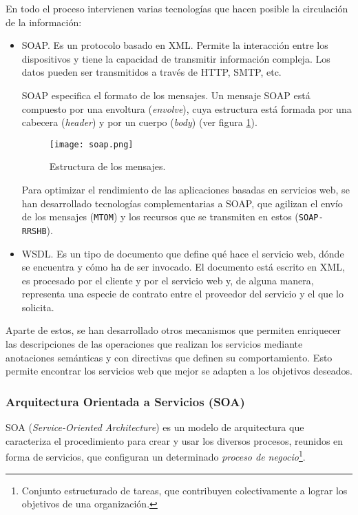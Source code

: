 En todo el proceso intervienen varias tecnologías que hacen posible la
circulación de la información:
\begin{itemize}
\item \acs{SOAP}. Es un protocolo basado en \acs{XML}. Permite la
interacción entre los dispositivos y tiene la capacidad de transmitir
información compleja. Los datos pueden ser transmitidos a través de 
\acs{HTTP}, \acs{SMTP}, etc.

\acs{SOAP} especifica el formato de los mensajes. Un mensaje \acs{SOAP} está
compuesto por una envoltura (\emph{envolve}), cuya estructura está formada
por una cabecera (\emph{header}) y por un cuerpo (\emph{body})
(ver figura \ref{fig:soap}).

  \begin{figure}[H]
    \begin{center}
      \texttt{[image: soap.png]}
      \caption{Estructura de los mensajes.}
      \label{fig:soap}
    \end{center}
  \end{figure}

Para optimizar el rendimiento de las aplicaciones basadas en servicios web, se 
han desarrollado tecnologías complementarias a \acs{SOAP}, que agilizan el 
envío de los mensajes (\texttt{MTOM}) y los recursos que se transmiten en estos 
(\texttt{SOAP-RRSHB}).

\item \acs{WSDL}. Es un tipo de documento que define qué hace el servicio web,
dónde se encuentra y cómo ha de ser invocado. El documento está escrito
en \acs{XML}, es procesado por el cliente y por el servicio web y, de alguna
manera, representa una especie de contrato entre el proveedor del servicio
y el que lo solicita.
\end{itemize}

Aparte de estos, se han desarrollado otros mecanismos que permiten 
enriquecer las descripciones de las operaciones que realizan los servicios 
mediante anotaciones semánticas y con directivas que definen su comportamiento.
Esto permite encontrar los servicios web que mejor se adapten a los objetivos 
deseados.

  \subsubsection{Arquitectura Orientada a Servicios (SOA)}
\acs{SOA} (\emph{Service-Oriented Architecture}) es un modelo de arquitectura 
que caracteriza el procedimiento para crear y usar los diversos procesos, 
reunidos en forma de servicios, que configuran un determinado \emph{proceso de 
negocio}\footnote{Conjunto estructurado de tareas, que contribuyen 
colectivamente a lograr los objetivos de una organización.}.

